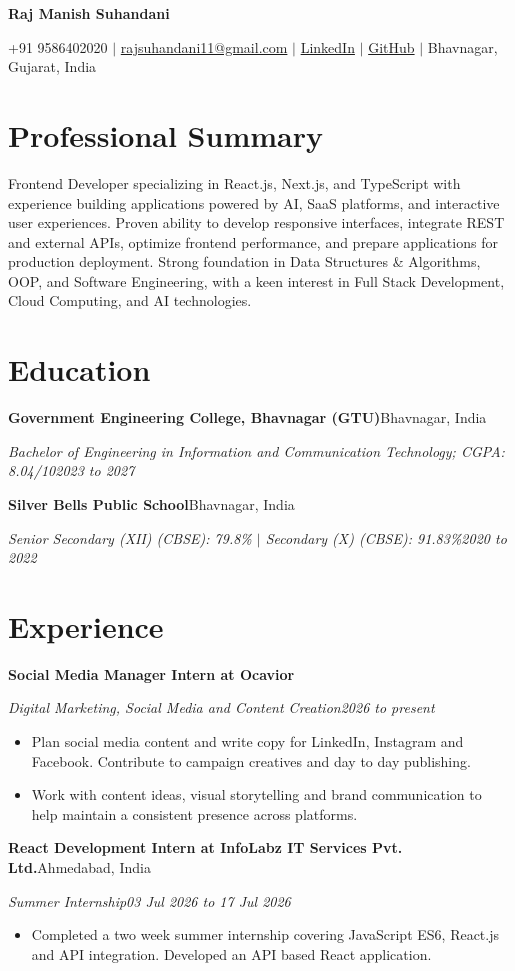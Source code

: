 \documentclass[letterpaper,10pt]{article}
\newcommand{\entry}[4]{%
\needspace{44pt}%
\vspace{2pt}\hspace{10.8pt}\textbf{#1}\hfill #2\par
\hspace{10.8pt}\textit{#3}\hfill\textit{#4}\par\vspace{1pt}%
}
\newcommand{\resumeitem}[1]{\item #1}
\begin{document}
\begin{center}
{\fontsize{24.8}{27}\selectfont\bfseries Raj Manish Suhandani}\par\vspace{3pt}
\fontsize{10}{11}\selectfont +91 9586402020 $\mid$ \href{mailto:rajsuhandani11@gmail.com}{rajsuhandani11@gmail.com} $\mid$ \href{https://www.linkedin.com/in/raj-suhandani-a4a393321}{LinkedIn} $\mid$ \href{https://github.com/RAJ-SUHANDANI}{GitHub} $\mid$ Bhavnagar, Gujarat, India
\end{center}
\vspace{-9pt}
\section{Professional Summary}
\hspace{10.8pt}\begin{minipage}[t]{\dimexpr\linewidth-10.8pt\relax}
Frontend Developer specializing in React.js, Next.js, and TypeScript with experience building applications powered by AI, SaaS platforms, and interactive user experiences. Proven ability to develop responsive interfaces, integrate REST and external APIs, optimize frontend performance, and prepare applications for production deployment. Strong foundation in Data Structures \& Algorithms, OOP, and Software Engineering, with a keen interest in Full Stack Development, Cloud Computing, and AI technologies.
\end{minipage}
\section{Education}
\entry{Government Engineering College, Bhavnagar (GTU)}{Bhavnagar, India}{Bachelor of Engineering in Information and Communication Technology; CGPA: 8.04/10}{2023 to 2027}
\entry{Silver Bells Public School}{Bhavnagar, India}{Senior Secondary (XII) (CBSE): 79.8\% $\mid$ Secondary (X) (CBSE): 91.83\%}{2020 to 2022}
\section{Experience}
\entry{Social Media Manager Intern at Ocavior}{}{Digital Marketing, Social Media and Content Creation}{2026 to present}
\begin{itemize}
\resumeitem{Plan social media content and write copy for LinkedIn, Instagram and Facebook. Contribute to campaign creatives and day to day publishing.}
\resumeitem{Work with content ideas, visual storytelling and brand communication to help maintain a consistent presence across platforms.}
\end{itemize}
\vspace{-2pt}
\entry{React Development Intern at InfoLabz IT Services Pvt. Ltd.}{Ahmedabad, India}{Summer Internship}{03 Jul 2026 to 17 Jul 2026}
\begin{itemize}
\resumeitem{Completed a two week summer internship covering JavaScript ES6, React.js and API integration. Developed an API based React application.}
\end{itemize}
\end{document}
